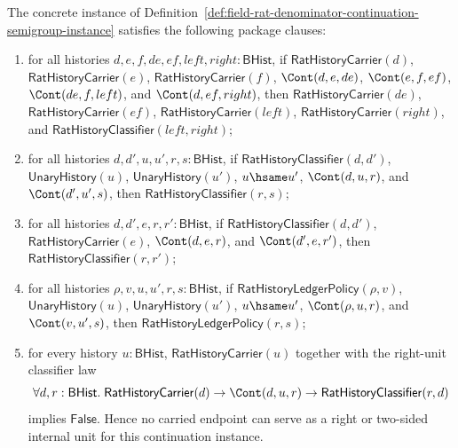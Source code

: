 \begin{theorem}
\label{thm:field-rat-denominator-continuation-semigroup-package}
The concrete instance of
Definition~\ref{def:field-rat-denominator-continuation-semigroup-instance}
satisfies
the following package clauses:
\begin{enumerate}
  \item for all histories $d,e,f,de,ef,left,right:\mathsf{BHist}$, if
  $\mathsf{RatHistoryCarrier}(d)$, $\mathsf{RatHistoryCarrier}(e)$,
  $\mathsf{RatHistoryCarrier}(f)$, $\Cont(d,e,de)$, $\Cont(e,f,ef)$,
  $\Cont(de,f,left)$, and $\Cont(d,ef,right)$, then
  $\mathsf{RatHistoryCarrier}(de)$, $\mathsf{RatHistoryCarrier}(ef)$,
  $\mathsf{RatHistoryCarrier}(left)$, $\mathsf{RatHistoryCarrier}(right)$, and
  $\mathsf{RatHistoryClassifier}(left,right)$;
  \item for all histories $d,d',u,u',r,s:\mathsf{BHist}$, if
  $\mathsf{RatHistoryClassifier}(d,d')$, $\mathsf{UnaryHistory}(u)$,
  $\mathsf{UnaryHistory}(u')$, $u\hsame u'$, $\Cont(d,u,r)$, and
  $\Cont(d',u',s)$, then $\mathsf{RatHistoryClassifier}(r,s)$;
  \item for all histories $d,d',e,r,r':\mathsf{BHist}$, if
  $\mathsf{RatHistoryClassifier}(d,d')$, $\mathsf{RatHistoryCarrier}(e)$,
  $\Cont(d,e,r)$, and $\Cont(d',e,r')$, then
  $\mathsf{RatHistoryClassifier}(r,r')$;
  \item for all histories $\rho,v,u,u',r,s:\mathsf{BHist}$, if
  $\mathsf{RatHistoryLedgerPolicy}(\rho,v)$, $\mathsf{UnaryHistory}(u)$,
  $\mathsf{UnaryHistory}(u')$, $u\hsame u'$, $\Cont(\rho,u,r)$, and
  $\Cont(v,u',s)$, then $\mathsf{RatHistoryLedgerPolicy}(r,s)$;
  \item for every history $u:\mathsf{BHist}$,
  $\mathsf{RatHistoryCarrier}(u)$ together with the right-unit classifier law
  $$
  \forall d,r:\mathsf{BHist}.\;
  \mathsf{RatHistoryCarrier}(d)\to
  \Cont(d,u,r)\to
  \mathsf{RatHistoryClassifier}(r,d)
  $$
  implies $\mathsf{False}$. Hence no carried endpoint can serve as a right or
  two-sided internal unit for this continuation instance.
\end{enumerate}
\end{theorem}
